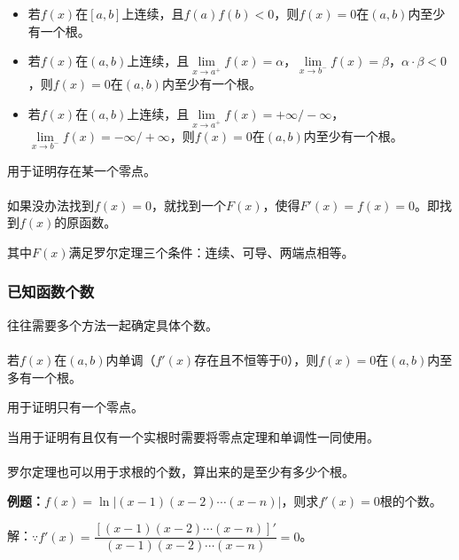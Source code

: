 \begin{itemize}
    \item 若$f(x)$在$[a,b]$上连续，且$f(a)f(b)<0$，则$f(x)=0$在$(a,b)$内至少有一个根。
    \item 若$f(x)$在$(a,b)$上连续，且$\lim\limits_{x\to a^+}f(x)=\alpha$，$\lim\limits_{x\to b^-}f(x)=\beta$，$\alpha\cdot\beta<0$，则$f(x)=0$在$(a,b)$内至少有一个根。
    \item 若$f(x)$在$(a,b)$上连续，且$\lim\limits_{x\to a^+}f(x)=+\infty/-\infty$，$\lim\limits_{x\to b^-}f(x)=-\infty/+\infty$，则$f(x)=0$在$(a,b)$内至少有一个根。
\end{itemize}

用于证明存在某一个零点。

\paragraph{} \leavevmode \medskip

如果没办法找到$f(x)=0$，就找到一个$F(x)$，使得$F'(x)=f(x)=0$。即找到$f(x)$的原函数。

其中$F(x)$满足罗尔定理三个条件：连续、可导、两端点相等。

\subsubsection{已知函数个数}

往往需要多个方法一起确定具体个数。

\paragraph{} \leavevmode \medskip

若$f(x)$在$(a,b)$内单调（$f'(x)$存在且不恒等于0），则$f(x)=0$在$(a,b)$内至多有一个根。

用于证明只有一个零点。

当用于证明有且仅有一个实根时需要将零点定理和单调性一同使用。

\paragraph{} \leavevmode \medskip

罗尔定理也可以用于求根的个数，算出来的是至少有多少个根。

\textbf{例题：}$f(x)=\ln\vert(x-1)(x-2)\cdots(x-n)\vert$，则求$f'(x)=0$根的个数。

解：$\because f'(x)=\dfrac{[(x-1)(x-2)\cdots(x-n)]'}{(x-1)(x-2)\cdots(x-n)}=0$。

